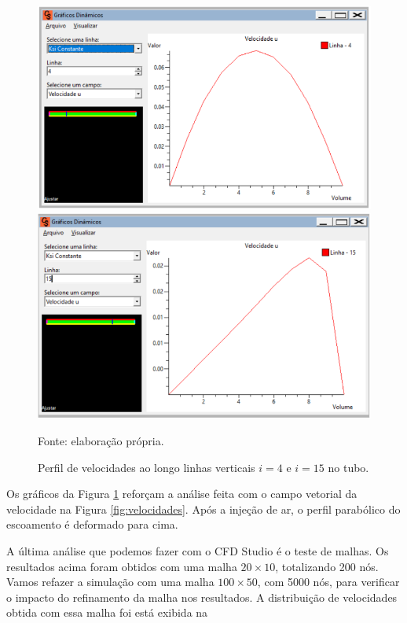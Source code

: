 \begin{figure}[h!]
    \caption{Perfil de velocidades ao longo linhas verticais $i = 4$ e $i = 15$ no tubo.}
    \label{fig:velocidadesLinha}
    \centering
    \centerline{\includegraphics[scale=0.4]{velocidadeLinha4.png}}
    \centerline{\includegraphics[scale=0.4]{velocidadeLinha15.png}}
    \par{Fonte: elaboração própria.}
\end{figure}

Os gráficos da Figura \ref*{fig:velocidadesLinha} reforçam a análise feita com o campo vetorial da velocidade 
na Figura \ref*{fig:velocidades}. Após a injeção de ar, o perfil parabólico do escoamento é deformado
para cima.

A última análise que podemos fazer com o CFD Studio é o teste de malhas. Os resultados acima 
foram obtidos com uma malha $20 \times 10$, totalizando 200 nós. Vamos refazer a simulação com
uma malha $100 \times 50$, com 5000 nós, para verificar o impacto do refinamento da malha nos resultados.
A distribuição de velocidades obtida com essa malha foi está exibida na 

